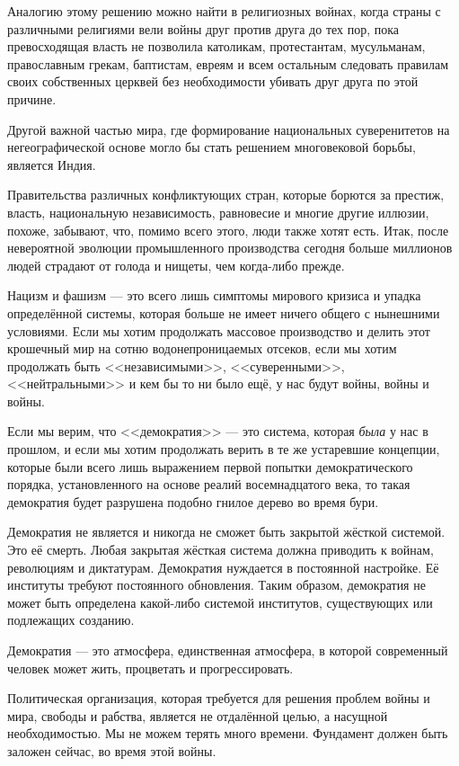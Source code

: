 Аналогию этому решению можно найти в религиозных войнах, когда страны с различными религиями вели войны друг против друга до тех пор, пока превосходящая власть не позволила католикам, протестантам, мусульманам, православным грекам, баптистам, евреям и всем остальным следовать правилам своих собственных церквей без необходимости убивать друг друга по этой причине.
 
Другой важной частью мира, где формирование национальных суверенитетов на негеографической основе могло бы стать решением многовековой борьбы, является Индия.

Правительства различных конфликтующих стран, которые борются за престиж, власть, национальную независимость, равновесие и многие другие иллюзии, похоже, забывают, что, помимо всего этого, люди также хотят есть. Итак, после невероятной эволюции промышленного производства сегодня больше миллионов людей страдают от голода и нищеты, чем когда-либо прежде.
 
Нацизм и фашизм — это всего лишь симптомы мирового кризиса и упадка определённой системы, которая больше не имеет ничего общего с нынешними условиями. Если мы хотим продолжать массовое производство и делить этот крошечный мир на сотню водонепроницаемых отсеков, если мы хотим продолжать быть <<независимыми>>, <<суверенными>>, <<нейтральными>> и кем бы то ни было ещё, у нас будут войны, войны и войны.

Если мы верим, что <<демократия>> — это система, которая \textit{была} у нас в прошлом, и если мы хотим продолжать верить в те же устаревшие концепции, которые были всего лишь выражением первой попытки демократического порядка, установленного на основе реалий восемнадцатого века, то такая демократия будет разрушена подобно гнилое дерево во время бури.
 
Демократия не является и никогда не сможет быть закрытой жёсткой системой. Это её смерть. Любая закрытая жёсткая система должна приводить к войнам, революциям и диктатурам. Демократия нуждается в постоянной настройке. Её институты требуют постоянного обновления. Таким образом, демократия не может быть определена какой-либо системой институтов, существующих или подлежащих созданию.

Демократия — это атмосфера, единственная атмосфера, в которой современный человек может жить, процветать и прогрессировать.
 
Политическая организация, которая требуется для решения проблем войны и мира, свободы и рабства, является не отдалённой целью, а насущной необходимостью. Мы не можем терять много времени. Фундамент должен быть заложен сейчас, во время этой войны.

